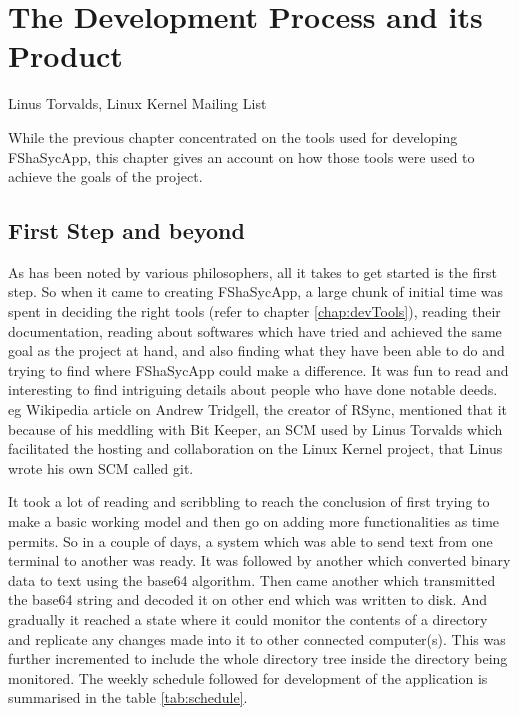 \chapter{The Development Process and its Product}
\begin{epigraphs}
        {Linus Torvalds, Linux Kernel Mailing List}
\end{epigraphs}
\label{chap:devProc}
While the previous chapter concentrated on the tools used for developing FShaSycApp, this chapter gives an account on how those tools were used to achieve the goals of the project.

\section{First Step and beyond}
As has been noted by various philosophers, all it takes to get started is the first step. So when it came to creating FShaSycApp, a large chunk of initial time was spent in deciding the right tools (refer to chapter \ref{chap:devTools}), reading their documentation, reading about softwares which have tried and achieved the same goal as the project at hand, and also finding what they have been able to do and trying to find where FShaSycApp could make a difference. It was fun to read and interesting to find intriguing details about people who have done notable deeds. eg Wikipedia article on Andrew Tridgell, the creator of RSync,  mentioned that it because of his meddling with Bit Keeper, an SCM used by Linus Torvalds which facilitated the hosting and collaboration on the Linux Kernel project, that Linus wrote his own SCM called git. \par
It took a lot of reading and scribbling to reach the conclusion of first trying to make a basic working model and then go on adding more functionalities as time permits. So in a couple of days, a system which was able to send text from one terminal to another was ready. It was followed by another which converted binary data to text using the base64 algorithm. Then came another which transmitted the base64 string and decoded it on other end which was written to disk. And gradually it reached a state where it could monitor the contents of a directory and replicate any changes made into it to other connected computer(s). This was further incremented to include the whole directory tree inside the directory being monitored. The weekly schedule followed for development of the application is summarised in the table \ref{tab:schedule}.

